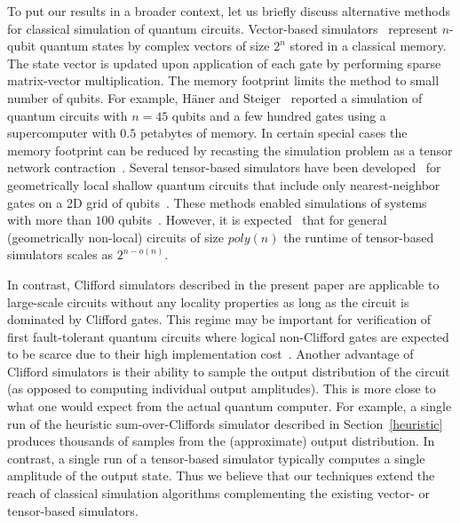 To put our results in a broader context, let us briefly discuss alternative methods for 
classical simulation of quantum circuits. Vector-based simulators~\cite{de2007massively,smelyanskiy2016qhipster,haner20170}
represent $n$-qubit quantum states by complex vectors of size $2^n$
stored in a classical memory.
The state vector is updated
upon application of each gate by performing sparse
matrix-vector multiplication. The memory footprint limits 
the method to small number of qubits. For example, 
H{\"a}ner and Steiger~\cite{haner20170}
reported a simulation of
quantum circuits with $n=45$ qubits and a few hundred gates 
using a  supercomputer with $0.5$ petabytes of memory.
In certain special cases 
the memory footprint can be reduced 
by recasting the simulation problem as a 
tensor network contraction~\cite{markov2008simulating,boixo2017simulation,aaronson2016complexity}.
Several tensor-based simulators have been developed~\cite{pednault2017breaking,li2018quantum,chen2018classical} 
for geometrically local  shallow quantum  circuits that include only nearest-neighbor
gates on a 2D grid of qubits~\cite{boixo2018characterizing}.
These methods enabled simulations of systems with more than $100$ qubits~\cite{chen2018classical}.
However, it is expected~\cite{alibaba} that for general (geometrically non-local) circuits 
of size $poly(n)$  the runtime of tensor-based simulators scales as $2^{n-o(n)}$.

In contrast, Clifford simulators described in the present paper are applicable to large-scale circuits
without any locality properties as long as the circuit is dominated by Clifford gates. 
This regime may be important for verification of first fault-tolerant quantum circuits
where  logical non-Clifford gates are expected to be scarce due to their high implementation
cost~\cite{fowler2013surface,jones2013low}.
Another advantage of Clifford simulators is their ability to sample the output
distribution of the circuit (as opposed to computing individual output amplitudes).
This is more close to what one would expect from the actual quantum computer. 
For example, a single run of the heuristic sum-over-Cliffords simulator
described in Section~\ref{heuristic} produces thousands of samples from the (approximate) output distribution. 
In contrast, a single run of a tensor-based simulator typically computes a single amplitude of the
output state.  Thus we believe that our techniques 
extend the reach of classical simulation algorithms complementing
the existing vector- or tensor-based simulators.

